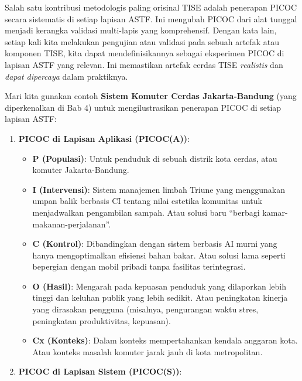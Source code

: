\documentclass[
  letterpaper,
  DIV=11,
  numbers=noendperiod]{scrreprt}
\providecommand{\tightlist}{%
  \setlength{\itemsep}{0pt}\setlength{\parskip}{0pt}}
\begin{document}
Salah satu kontribusi metodologis paling orisinal TISE adalah penerapan
PICOC secara sistematis di setiap lapisan ASTF. Ini mengubah PICOC dari
alat tunggal menjadi kerangka validasi multi-lapis yang komprehensif.
Dengan kata lain, setiap kali kita melakukan pengujian atau validasi
pada sebuah artefak atau komponen TISE, kita dapat mendefinisikannya
sebagai eksperimen PICOC di lapisan ASTF yang relevan. Ini memastikan
artefak cerdas TISE \emph{realistis} dan \emph{dapat dipercaya} dalam
praktiknya.

Mari kita gunakan contoh \textbf{Sistem Komuter Cerdas Jakarta-Bandung}
(yang diperkenalkan di Bab 4) untuk mengilustrasikan penerapan PICOC di
setiap lapisan ASTF:

\begin{enumerate}
\def\labelenumi{\arabic{enumi}.}
\tightlist
\item
  \textbf{PICOC di Lapisan Aplikasi (PICOC(A))}:

  \begin{itemize}
  \tightlist
  \item
    \textbf{P (Populasi)}: Untuk penduduk di sebuah distrik kota cerdas,
    atau komuter Jakarta-Bandung.
  \item
    \textbf{I (Intervensi)}: Sistem manajemen limbah Triune yang
    menggunakan umpan balik berbasis CI tentang nilai estetika komunitas
    untuk menjadwalkan pengambilan sampah. Atau solusi baru ``berbagi
    kamar-makanan-perjalanan''.
  \item
    \textbf{C (Kontrol)}: Dibandingkan dengan sistem berbasis AI murni
    yang hanya mengoptimalkan efisiensi bahan bakar. Atau solusi lama
    seperti bepergian dengan mobil pribadi tanpa fasilitas terintegrasi.
  \item
    \textbf{O (Hasil)}: Mengarah pada kepuasan penduduk yang dilaporkan
    lebih tinggi dan keluhan publik yang lebih sedikit. Atau peningkatan
    kinerja yang dirasakan pengguna (misalnya, pengurangan waktu stres,
    peningkatan produktivitas, kepuasan).
  \item
    \textbf{Cx (Konteks)}: Dalam konteks mempertahankan kendala anggaran
    kota. Atau konteks masalah komuter jarak jauh di kota metropolitan.
  \end{itemize}
\item
  \textbf{PICOC di Lapisan Sistem (PICOC(S))}:


\end{enumerate}
\end{document}
